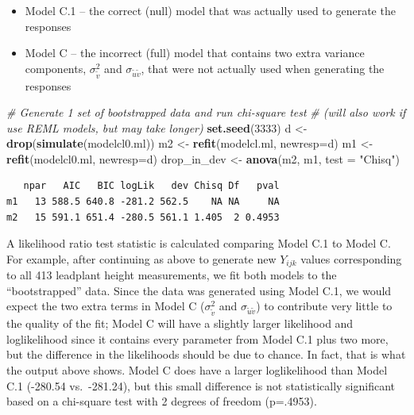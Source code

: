 \documentclass[
]{krantz}
\newenvironment{Shaded}{\begin{snugshade}}{\end{snugshade}}
\newcommand{\CommentTok}[1]{\textcolor[rgb]{0.37,0.37,0.37}{\textit{#1}}}
\newcommand{\DataTypeTok}[1]{\textcolor[rgb]{0.27,0.27,0.27}{#1}}
\newcommand{\DecValTok}[1]{\textcolor[rgb]{0.06,0.06,0.06}{#1}}
\newcommand{\KeywordTok}[1]{\textcolor[rgb]{0.27,0.27,0.27}{\textbf{#1}}}
\newcommand{\NormalTok}[1]{#1}
\newcommand{\StringTok}[1]{\textcolor[rgb]{0.5,0.5,0.5}{#1}}
\providecommand{\tightlist}{%
  \setlength{\itemsep}{0pt}\setlength{\parskip}{0pt}}
\begin{document}
\begin{itemize}
\tightlist
\item
  Model C.1 -- the correct (null) model that was actually used to generate the responses
\item
  Model C -- the incorrect (full) model that contains two extra variance components, \(\sigma_{\tilde{v}}^{2}\) and \(\sigma_{\tilde{u}\tilde{v}}\), that were not actually used when generating the responses
\end{itemize}

\begin{Shaded}
\begin{Highlighting}[]
\CommentTok{# Generate 1 set of bootstrapped data and run chi-square test}
\CommentTok{#  (will also work if use REML models, but may take longer)}
\KeywordTok{set.seed}\NormalTok{(}\DecValTok{3333}\NormalTok{)}
\NormalTok{d <-}\StringTok{ }\KeywordTok{drop}\NormalTok{(}\KeywordTok{simulate}\NormalTok{(modelcl0.ml))}
\NormalTok{m2 <-}\StringTok{ }\KeywordTok{refit}\NormalTok{(modelcl.ml, }\DataTypeTok{newresp=}\NormalTok{d)}
\NormalTok{m1 <-}\StringTok{ }\KeywordTok{refit}\NormalTok{(modelcl0.ml, }\DataTypeTok{newresp=}\NormalTok{d)}
\NormalTok{drop_in_dev <-}\StringTok{ }\KeywordTok{anova}\NormalTok{(m2, m1, }\DataTypeTok{test =} \StringTok{"Chisq"}\NormalTok{)}
\end{Highlighting}
\end{Shaded}

\begin{verbatim}
   npar   AIC   BIC logLik   dev Chisq Df   pval
m1   13 588.5 640.8 -281.2 562.5    NA NA     NA
m2   15 591.1 651.4 -280.5 561.1 1.405  2 0.4953
\end{verbatim}

A likelihood ratio test statistic is calculated comparing Model C.1 to Model C. For example, after continuing as above to generate new \(Y_{ijk}\) values corresponding to all 413 leadplant height measurements, we fit both models to the ``bootstrapped'' data. Since the data was generated using Model C.1, we would expect the two extra terms in Model C (\(\sigma^2_{\tilde{v}}\) and \(\sigma_{\tilde{u}\tilde{v}}\)) to contribute very little to the quality of the fit; Model C will have a slightly larger likelihood and loglikelihood since it contains every parameter from Model C.1 plus two more, but the difference in the likelihoods should be due to chance. In fact, that is what the output above shows. Model C does have a larger loglikelihood than Model C.1 (-280.54 vs.~-281.24), but this small difference is not statistically significant based on a chi-square test with 2 degrees of freedom (p=.4953).
\end{document}
